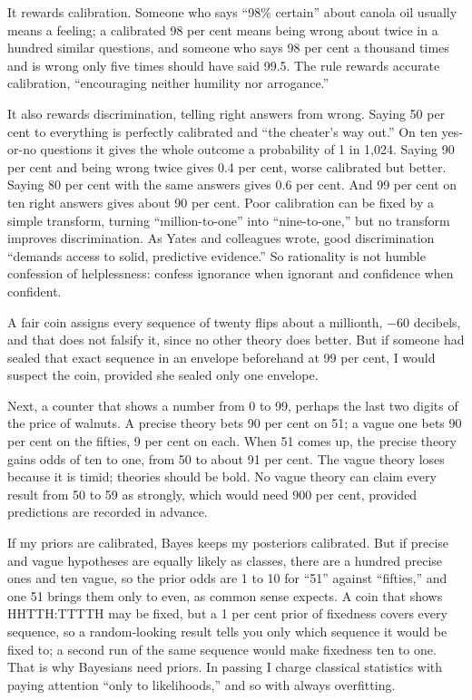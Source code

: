 It rewards calibration. Someone who says ``98\% certain'' about canola oil usually means a feeling; a calibrated 98 per cent means being wrong about twice in a hundred similar questions, and someone who says 98 per cent a thousand times and is wrong only five times should have said 99.5. The rule rewards accurate calibration, ``encouraging neither humility nor arrogance.''

It also rewards discrimination, telling right answers from wrong. Saying 50 per cent to everything is perfectly calibrated and ``the cheater's way out.'' On ten yes-or-no questions it gives the whole outcome a probability of 1 in 1,024. Saying 90 per cent and being wrong twice gives 0.4 per cent, worse calibrated but better. Saying 80 per cent with the same answers gives 0.6 per cent. And 99 per cent on ten right answers gives about 90 per cent. Poor calibration can be fixed by a simple transform, turning ``million-to-one'' into ``nine-to-one,'' but no transform improves discrimination. As Yates and colleagues wrote, good discrimination ``demands access to solid, predictive evidence.'' So rationality is not humble confession of helplessness: confess ignorance when ignorant and confidence when confident.

A fair coin assigns every sequence of twenty flips about a millionth, $-60$ decibels, and that does not falsify it, since no other theory does better. But if someone had sealed that exact sequence in an envelope beforehand at 99 per cent, I would suspect the coin, provided she sealed only one envelope. 

Next, a counter that shows a number from 0 to 99, perhaps the last two digits of the price of walnuts. A precise theory bets 90 per cent on 51; a vague one bets 90 per cent on the fifties, 9 per cent on each. When 51 comes up, the precise theory gains odds of ten to one, from 50 to about 91 per cent. The vague theory loses because it is timid; theories should be bold. No vague theory can claim every result from 50 to 59 as strongly, which would need 900 per cent, provided predictions are recorded in advance.

If my priors are calibrated, Bayes keeps my posteriors calibrated. But if precise and vague hypotheses are equally likely as classes, there are a hundred precise ones and ten vague, so the prior odds are 1 to 10 for ``51'' against ``fifties,'' and one 51 brings them only to even, as common sense expects. A coin that shows HHTTH:TTTTH may be fixed, but a 1 per cent prior of fixedness covers every sequence, so a random-looking result tells you only which sequence it would be fixed to; a second run of the same sequence would make fixedness ten to one. That is why Bayesians need priors. In passing I charge classical statistics with paying attention ``only to likelihoods,'' and so with always overfitting.  

